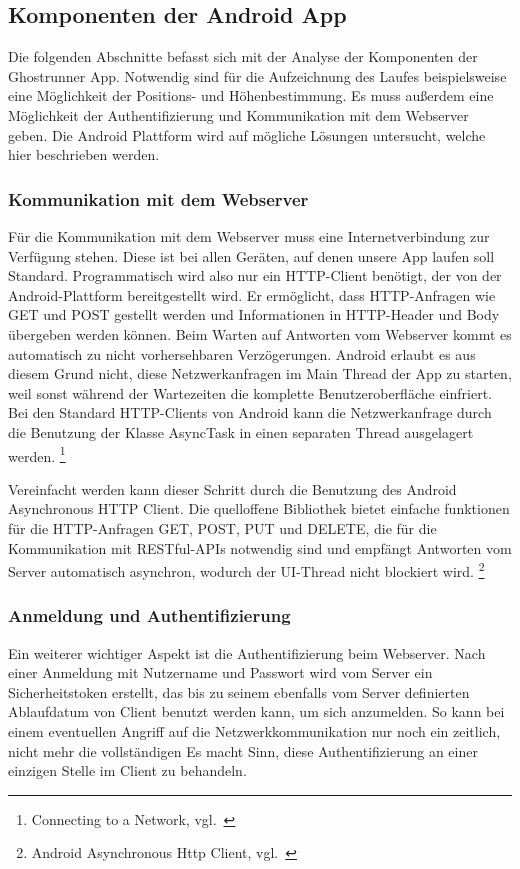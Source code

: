 \subsection{Komponenten der Android App}
Die folgenden Abschnitte befasst sich mit der Analyse der Komponenten der Ghostrunner App. Notwendig sind für die Aufzeichnung des Laufes beispielsweise eine Möglichkeit der Positions- und Höhenbestimmung. Es muss außerdem eine Möglichkeit der Authentifizierung und Kommunikation mit dem Webserver geben. Die Android Plattform wird auf mögliche Lösungen untersucht, welche hier beschrieben werden.
\subsubsection{Kommunikation mit dem Webserver}
Für die Kommunikation mit dem Webserver muss eine Internetverbindung zur Verfügung stehen. Diese ist bei allen Geräten, auf denen unsere App laufen soll Standard. Programmatisch wird also nur ein HTTP-Client benötigt, der von der Android-Plattform bereitgestellt wird. Er ermöglicht, dass  HTTP-Anfragen wie GET und POST gestellt werden und Informationen in HTTP-Header und Body übergeben werden können. Beim Warten auf Antworten vom Webserver kommt es automatisch zu nicht vorhersehbaren Verzögerungen. Android erlaubt es aus diesem Grund nicht, diese Netzwerkanfragen im Main Thread der App zu starten, weil sonst während der Wartezeiten die komplette Benutzeroberfläche einfriert. Bei den Standard HTTP-Clients von Android kann die Netzwerkanfrage durch die Benutzung der Klasse AsyncTask in einen separaten Thread ausgelagert werden. \footnote{Connecting to a Network, vgl.~\cite{androidnetwork}}

Vereinfacht werden kann dieser Schritt durch die Benutzung des Android Asynchronous HTTP Client. Die quelloffene Bibliothek bietet einfache funktionen für die HTTP-Anfragen GET, POST, PUT und DELETE, die für die Kommunikation mit RESTful-APIs notwendig sind und empfängt Antworten vom Server automatisch asynchron, wodurch der UI-Thread nicht blockiert wird. \footnote{Android Asynchronous Http Client, vgl.~\cite{loopj}}
\subsubsection{Anmeldung und Authentifizierung}
Ein weiterer wichtiger Aspekt ist die Authentifizierung beim Webserver. Nach einer Anmeldung mit Nutzername und Passwort wird vom Server ein Sicherheitstoken erstellt, das bis zu seinem ebenfalls vom Server definierten Ablaufdatum von Client benutzt werden kann, um sich anzumelden. So kann bei einem eventuellen Angriff auf die Netzwerkkommunikation nur noch ein zeitlich, nicht mehr die vollständigen
Es macht Sinn, diese Authentifizierung an einer einzigen Stelle im Client zu behandeln.

